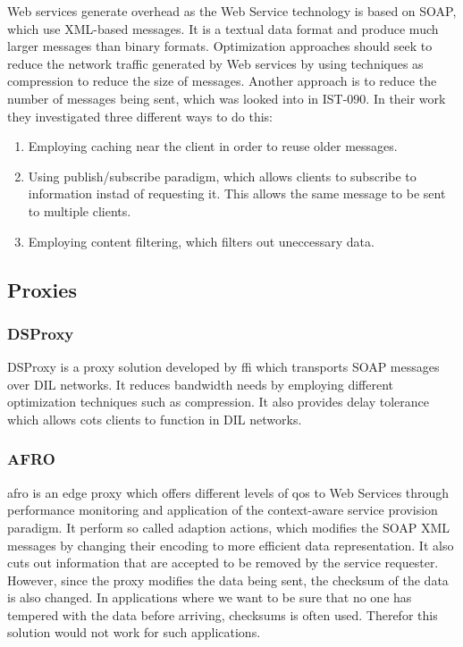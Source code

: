 \documentclass[USenglish]{ifimaster}
\begin{document}
Web services generate overhead as the Web Service technology is based on SOAP,
which use XML-based messages. It is a textual data format and produce much
larger messages than binary formats. Optimization approaches should seek to
reduce the network traffic generated by Web services by using techniques as
compression to reduce the size of messages. Another approach is to reduce the
number of messages being sent, which was looked into in IST-090\cite{IST-090}. In
their work they investigated three different ways to do this:

\begin{enumerate}
    \item Employing caching near the client in order to reuse older messages.
    \item Using publish/subscribe paradigm, which allows clients to subscribe to
    information instad of requesting it. This allows the same message to be sent
    to multiple clients.
    \item Employing content filtering, which filters out uneccessary data.
\end{enumerate}

\subsection{Proxies}


\subsubsection{DSProxy}

DSProxy is a proxy solution developed by \gls{ffi} which transports SOAP
messages over DIL networks. It reduces bandwidth needs by employing different
optimization techniques such as compression. It also provides delay tolerance
which allows \gls{cots} clients to function in DIL networks.


\subsubsection{AFRO}

\gls{afro} is an edge proxy which offers different levels of \gls{qos} to Web
Services through performance monitoring and application of the context-aware
service provision paradigm. It perform so called adaption actions, which
modifies the SOAP XML messages by changing their encoding to more efficient data
representation. It also cuts out information that are accepted to be removed by
the service requester. However, since the proxy modifies the data being sent,
the checksum of the data is also changed. In applications where we want to be
sure that no one has tempered with the data before arriving, checksums is often
used. Therefor this solution would not work for such applications.
\end{document}
